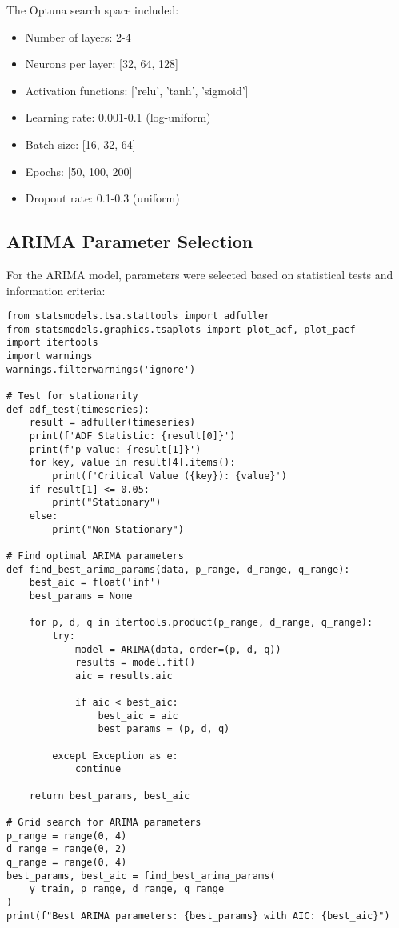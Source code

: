 \documentclass[12pt]{article}
\begin{document}
The Optuna search space included:
\begin{itemize}
    \item Number of layers: 2-4
    \item Neurons per layer: [32, 64, 128]
    \item Activation functions: ['relu', 'tanh', 'sigmoid']
    \item Learning rate: 0.001-0.1 (log-uniform)
    \item Batch size: [16, 32, 64]
    \item Epochs: [50, 100, 200]
    \item Dropout rate: 0.1-0.3 (uniform)
\end{itemize}

\subsection{ARIMA Parameter Selection}
\label{subsec:arima_parameter}

For the ARIMA model, parameters were selected based on statistical tests and information criteria:

\begin{verbatim}
from statsmodels.tsa.stattools import adfuller
from statsmodels.graphics.tsaplots import plot_acf, plot_pacf
import itertools
import warnings
warnings.filterwarnings('ignore')

# Test for stationarity
def adf_test(timeseries):
    result = adfuller(timeseries)
    print(f'ADF Statistic: {result[0]}')
    print(f'p-value: {result[1]}')
    for key, value in result[4].items():
        print(f'Critical Value ({key}): {value}')
    if result[1] <= 0.05:
        print("Stationary")
    else:
        print("Non-Stationary")

# Find optimal ARIMA parameters
def find_best_arima_params(data, p_range, d_range, q_range):
    best_aic = float('inf')
    best_params = None
    
    for p, d, q in itertools.product(p_range, d_range, q_range):
        try:
            model = ARIMA(data, order=(p, d, q))
            results = model.fit()
            aic = results.aic
            
            if aic < best_aic:
                best_aic = aic
                best_params = (p, d, q)
                
        except Exception as e:
            continue
    
    return best_params, best_aic

# Grid search for ARIMA parameters
p_range = range(0, 4)
d_range = range(0, 2)
q_range = range(0, 4)
best_params, best_aic = find_best_arima_params(
    y_train, p_range, d_range, q_range
)
print(f"Best ARIMA parameters: {best_params} with AIC: {best_aic}")
\end{verbatim}
\end{document}
